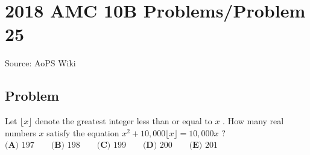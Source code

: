 \documentclass[12pt]{article}
\begin{document}
\section*{{2018 AMC 10B Problems/Problem 25}}
Source: AoPS Wiki

\subsection*{Problem}
Let $\lfloor x \rfloor$ denote the greatest integer less than or equal to $x$ . How many real numbers $x$ satisfy the equation $x^2 + 10,000\lfloor x \rfloor = 10,000x$ ? $\textbf{(A) } 197 \qquad \textbf{(B) } 198 \qquad \textbf{(C) } 199 \qquad \textbf{(D) } 200 \qquad \textbf{(E) } 201$
\end{document}
